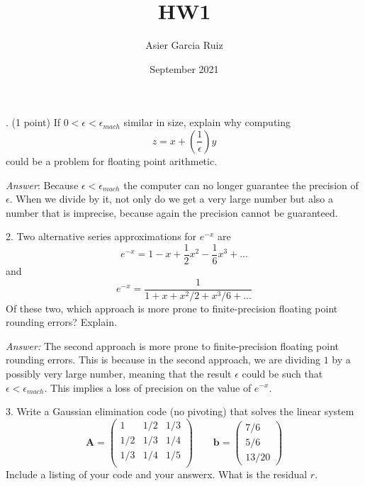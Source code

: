 \documentclass{article}
\title{HW1}
\author{Asier Garcia Ruiz }
\date{September 2021}
\begin{document}
    . (1 point) If $0 < \epsilon <\epsilon_{mach}$ similar in size, explain why computing 
    $$z = x + \left(\frac{1}{\epsilon}\right)y$$ could be a problem for floating point arithmetic.

    \textit{Answer}: Because $\epsilon < \epsilon_{mach}$ the computer can no longer guarantee
    the precision of $\epsilon$. When we divide by it, not only do we get a very large number
    but also a number that is imprecise, because again the precision cannot be guaranteed.

    \vspace{2mm}
    2. Two alternative series approximations for $e^{-x}$ are
    $$e^{-x} = 1 - x + \frac{1}{2}x^2 - \frac{1}{6}x^3 + ...$$ and 
    $$e^{-x} = \frac{1}{1 + x + x^2/2 + x^3/6 + ...}$$
    Of these two, which approach is more prone to finite-precision floating point rounding errors?
    Explain.
    
    \textit{Answer:} The second approach is more prone to finite-precision floating point rounding
    errors. This is because in the second approach, we are dividing $1$ by a possibly very large
    number, meaning that the result $\epsilon$ could be such that $\epsilon < \epsilon_{mach}$. This
    implies a loss of precision on the value of $e^{-x}$.

    \vspace{1cm}
    3. Write  a  Gaussian  elimination  code  (no  pivoting)  that  solves  the  linear  system
    $$\bm{A}=\begin{pmatrix}
        1 & 1/2 &  1/3 \\
        1/2 & 1/3 & 1/4 \\
        1/3 & 1/4 & 1/5 \\
    \end{pmatrix}
    \qquad \bm{b} = \begin{pmatrix}
        7/6 \\ 5/6\\ 13/20
    \end{pmatrix}$$
    Include a listing of your code and your answerx.  What is the residual $r$.
\end{document}
